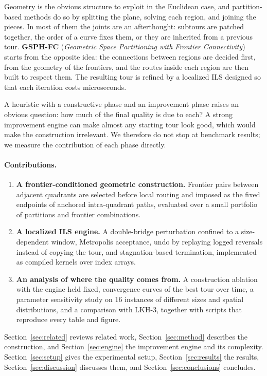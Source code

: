 \documentclass[runningheads]{llncs}
\begin{document}
Geometry is the obvious structure to exploit in the Euclidean case, and
partition-based methods do so by splitting the plane, solving each
region, and joining the pieces. In most of them the joints are an
afterthought: subtours are patched together, the order of a curve fixes
them, or they are inherited from a previous tour. \textbf{GSPH-FC}
(\textit{Geometric Space Partitioning with Frontier Connectivity})
starts from the opposite idea: the connections between regions are
decided first, from the geometry of the frontiers, and the routes inside
each region are then built to respect them. The resulting tour is
refined by a localized ILS designed so that each iteration costs
microseconds.

A heuristic with a constructive phase and an improvement phase raises an
obvious question: how much of the final quality is due to each? A
strong improvement engine can make almost any starting tour look good,
which would make the construction irrelevant. We therefore do not stop
at benchmark results; we measure the contribution of each phase
directly.

\paragraph{Contributions.}
\begin{enumerate}
  \item \textbf{A frontier-conditioned geometric construction.} Frontier
    pairs between adjacent quadrants are selected before local routing
    and imposed as the fixed endpoints of anchored intra-quadrant paths,
    evaluated over a small portfolio of partitions and frontier
    combinations.
  \item \textbf{A localized ILS engine.} A double-bridge perturbation
    confined to a size-dependent window, Metropolis acceptance, undo by
    replaying logged reversals instead of copying the tour, and
    stagnation-based termination, implemented as compiled kernels over
    index arrays.
  \item \textbf{An analysis of where the quality comes from.} A
    construction ablation with the engine held fixed, convergence curves
    of the best tour over time, a parameter sensitivity study on 16
    instances of different sizes and spatial distributions, and a
    comparison with LKH-3, together with scripts that reproduce every
    table and figure.
\end{enumerate}

Section~\ref{sec:related} reviews related work,
Section~\ref{sec:method} describes the construction, and
Section~\ref{sec:engine} the improvement engine and its complexity.
Section~\ref{sec:setup} gives the experimental setup,
Section~\ref{sec:results} the results, Section~\ref{sec:discussion}
discusses them, and Section~\ref{sec:conclusions} concludes.
\end{document}
